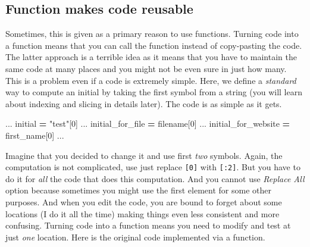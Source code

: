 \documentclass[
]{book}
\newenvironment{Shaded}{\begin{snugshade}}{\end{snugshade}}
\newcommand{\DecValTok}[1]{\textcolor[rgb]{0.00,0.00,0.81}{#1}}
\newcommand{\NormalTok}[1]{#1}
\newcommand{\OperatorTok}[1]{\textcolor[rgb]{0.81,0.36,0.00}{\textbf{#1}}}
\newcommand{\StringTok}[1]{\textcolor[rgb]{0.31,0.60,0.02}{#1}}
\begin{document}
\hypertarget{function-makes-code-reusable}{%
\subsection{Function makes code reusable}\label{function-makes-code-reusable}}

Sometimes, this is given as a primary reason to use functions. Turning code into a function means that you can call the function instead of copy-pasting the code. The latter approach is a terrible idea as it means that you have to maintain the same code at many places and you might not be even sure in just how many. This is a problem even if a code is extremely simple. Here, we define a \emph{standard} way to compute an initial by taking the first symbol from a string (you will learn about indexing and slicing in details later). The code is as simple as it gets.

\begin{Shaded}
\begin{Highlighting}[]
\NormalTok{...}
\NormalTok{initial }\OperatorTok{=} \StringTok{"test"}\NormalTok{[}\DecValTok{0}\NormalTok{]}
\NormalTok{...}
\NormalTok{initial\_for\_file }\OperatorTok{=}\NormalTok{ filename[}\DecValTok{0}\NormalTok{]}
\NormalTok{...}
\NormalTok{initial\_for\_website }\OperatorTok{=}\NormalTok{ first\_name[}\DecValTok{0}\NormalTok{]}
\NormalTok{...}
\end{Highlighting}
\end{Shaded}

Imagine that you decided to change it and use first \emph{two} symbols. Again, the computation is not complicated, use just replace \texttt{{[}0{]}} with \texttt{{[}:2{]}}. But you have to do it for \emph{all} the code that does this computation. And you cannot use \emph{Replace All} option because sometimes you might use the first element for some other purposes. And when you edit the code, you are bound to forget about some locations (I do it all the time) making things even less consistent and more confusing. Turning code into a function means you need to modify and test at just \emph{one} location. Here is the original code implemented via a function.
\end{document}
